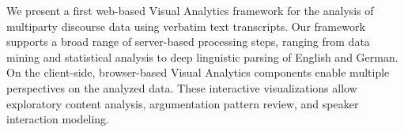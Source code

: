 We present a first web-based Visual Analytics framework for the analysis of multiparty discourse data using verbatim text transcripts. Our framework supports a broad range of server-based processing steps, ranging from data mining and statistical analysis to deep linguistic parsing of English and German. On the client-side, browser-based Visual Analytics components enable multiple perspectives on the analyzed data. These interactive visualizations allow exploratory content analysis, argumentation pattern review, and speaker interaction modeling.
